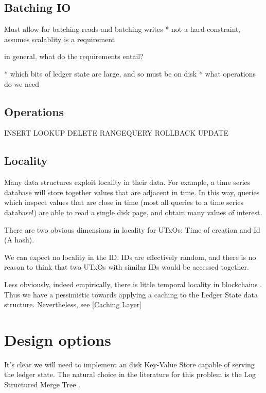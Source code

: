 \documentclass[11pt,a4paper]{article}
\begin{document}
\subsection{Batching IO}
Must allow for batching reads and batching writes
* not a hard constraint, assumes scalablity  is  a requirement

in general, what do the requirements entail?

* which bits of ledger state are large, and so must be on disk
* what operations do we need

\subsection{Operations}
\label{Operations}

INSERT
LOOKUP
DELETE
RANGEQUERY
ROLLBACK
UPDATE

\subsection{Locality}

Many data structures exploit locality in their data. For example, a time series database will store together values that are adjacent in time. In this way, queries which inspect values that are close in time (most all queries to a time series database!) are able to read a single disk page, and obtain many values of interest.

There are two obvious dimensions in locality for UTxOs: Time of creation and Id (A hash).

We can expect no locality in the ID. IDs are effectively random, and there is no reason to think that two UTxOs with similar IDs would be accessed together.

Less obviously, indeed empirically, there is little temporal locality in blockchains .
Thus we have a pessimistic towards applying a caching to the Ledger State data structure. Nevertheless, see \ref{Caching Layer}

\section{Design options}
\label{options}

It's clear we will need to implement an disk Key-Value Store capable of serving
the ledger state. The natural choice in the literature for this problem is the Log Structured Merge Tree . 
\end{document}
